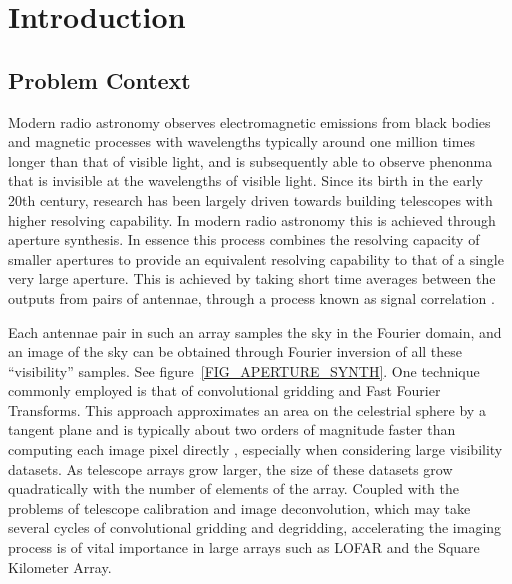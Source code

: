 \documentclass[a4paper, two column]{article}
\begin{document}
\saythanks
\section{Introduction}
\subsection{Problem Context}
Modern radio astronomy observes electromagnetic emissions from black bodies and magnetic processes with wavelengths typically around one million times longer than that of visible light, and is subsequently 
able to observe phenonma that is invisible at the wavelengths of visible light. Since its birth in the early 20th century, research has been largely driven towards building telescopes with higher resolving capability. 
In modern radio astronomy this is achieved through aperture synthesis. In essence this process combines the resolving capacity of smaller apertures to provide an equivalent
resolving capability to that of a single very large aperture. This is achieved by taking short time averages between the outputs from pairs of antennae, through a process known 
as signal correlation \cite{christiansenradiotelescopes,taylor1999synthesis}. 

Each antennae pair in such an array samples the sky in the Fourier domain, and an image of the sky can be obtained through Fourier inversion of all these ``visibility'' samples. See figure~\ref{FIG_APERTURE_SYNTH}. One technique commonly employed is that of convolutional gridding and 
Fast Fourier Transforms. This approach approximates an area on the celestrial sphere by a tangent plane and is typically about two orders of magnitude faster than computing each image pixel directly \cite[Lecture 7]{taylor1999synthesis}, especially when 
considering large visibility datasets. As telescope arrays grow larger, the size of these datasets grow quadratically with the number of elements of the array. Coupled with the problems of telescope calibration and image deconvolution, which may take several cycles of 
convolutional gridding and degridding, accelerating the imaging process is of vital importance in large arrays such as LOFAR and the Square Kilometer Array.
\end{document}
